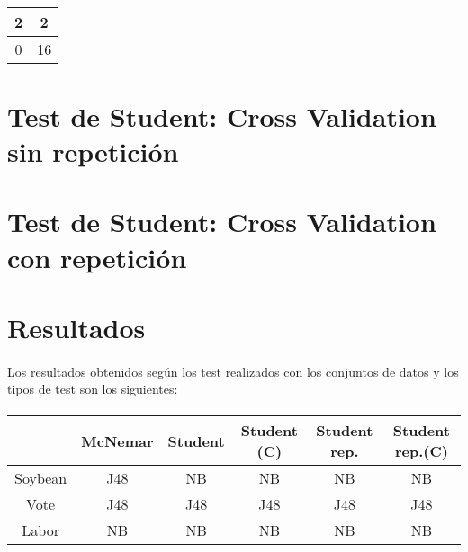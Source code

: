 \documentclass[10pt, a4paper,spanish]{article}
\begin{document}
			\paragraph{}
			\begin{center}
				\begin{tabular}{ | c | c | }
					\hline
					2 & 2 \\ \hline
					0 & 16 \\
					\hline
				\end{tabular}
			\end{center}


	\section{Test de Student: Cross Validation sin repetición}

        \paragraph{}

	\section{Test de Student: Cross Validation con repetición}

	        \paragraph{}
	\section{Resultados}

		\paragraph{}
		Los resultados obtenidos según los test realizados con los conjuntos de datos y los tipos de test son los siguientes:

		\paragraph{}
		\begin{center}
			\begin{tabular}{ | c || c | c | c | c | c | }
				\hline
				 			& McNemar	& Student	& Student (C) 	& Student rep. 	& Student rep.(C) 	\\ \hline \hline
				Soybean 	& J48 		& NB		& NB			& NB			& NB			 	\\ \hline
				Vote 		& J48 		& J48		& J48			& J48			& J48				\\ \hline
				Labor 		& NB 		& NB		& NB			& NB			& NB				\\
				\hline
			\end{tabular}
		\end{center}
\end{document}
